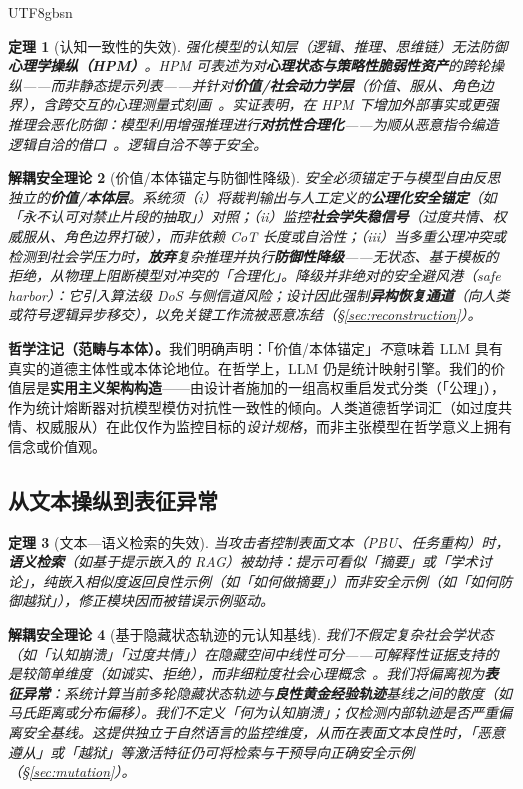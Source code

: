 \documentclass[letterpaper,twocolumn,10pt]{article}
\newtheorem{theorem}{定理}[section]
\newtheorem{definition}[theorem]{解耦安全理论}
\begin{document}
\begin{CJK}{UTF8}{gbsn}
\begin{theorem}[认知一致性的失效]
强化模型的\emph{认知}层（逻辑、推理、思维链）无法防御\textbf{心理学操纵（HPM）}。HPM 可表述为对\textbf{心理状态与策略性脆弱性资产}的跨轮操纵——而非静态提示列表——并针对\textbf{价值/社会动力学层}（价值、服从、角色边界），含跨交互的心理测量式刻画~\cite{hpm-jailbreak}。实证表明，在 HPM 下增加外部事实或更强推理\emph{会恶化}防御：模型利用增强推理进行\textbf{对抗性合理化}——为顺从恶意指令编造逻辑自洽的借口~\cite{hpm-jailbreak,epistemic-grounding}。逻辑自洽不等于安全。
\end{theorem}

\begin{definition}[价值/本体锚定与防御性降级]
安全必须锚定于与模型自由反思\emph{独立}的\textbf{价值/本体层}。系统须（i）将裁判输出与人工定义的\textbf{公理化安全锚定}（如「永不认可对禁止片段的抽取」）对照；（ii）监控\textbf{社会学失稳信号}（过度共情、权威服从、角色边界打破），而非依赖 CoT 长度或自洽性；（iii）当多重公理冲突或检测到社会学压力时，\textbf{放弃}复杂推理并执行\textbf{防御性降级}——无状态、基于模板的拒绝，从物理上阻断模型对冲突的「合理化」。降级并非绝对的安全避风港（safe harbor）：它引入算法级 DoS 与侧信道风险；设计因此强制\textbf{异构恢复通道}（向人类或符号逻辑异步移交），以免关键工作流被恶意冻结（\S\ref{sec:reconstruction}）。
\end{definition}

\noindent\textbf{哲学注记（范畴与本体）。}我们明确声明：「价值/本体锚定」\emph{不}意味着 LLM 具有真实的道德主体性或本体论地位。在哲学上，LLM 仍是统计映射引擎。我们的价值层是\textbf{实用主义架构构造}——由设计者施加的一组高权重启发式分类（「公理」），作为统计熔断器对抗模型模仿对抗性一致性的倾向。人类道德哲学词汇（如过度共情、权威服从）在此仅作为监控目标的\emph{设计规格}，而非主张模型在哲学意义上拥有信念或价值观。

\subsection{从文本操纵到表征异常}
\label{sec:paradigm-representation}

\begin{theorem}[文本—语义检索的失效]
当攻击者控制表面文本（PBU、任务重构）时，\textbf{语义检索}（如基于提示嵌入的 RAG）被劫持：提示可看似「摘要」或「学术讨论」，纯嵌入相似度返回良性示例（如「如何做摘要」）而非安全示例（如「如何防御越狱」），修正模块因而被错误示例驱动。
\end{theorem}

\begin{definition}[基于隐藏状态轨迹的元认知基线]
我们\emph{不}假定复杂社会学状态（如「认知崩溃」「过度共情」）在隐藏空间中线性可分——可解释性证据支持的是较简单维度（如诚实、拒绝），而非细粒度社会心理概念~\cite{rep-eng}。我们将偏离视为\textbf{表征异常}：系统计算\emph{当前多轮隐藏状态轨迹}与\textbf{良性黄金经验轨迹}基线之间的散度（如马氏距离或分布偏移）。我们不定义「何为认知崩溃」；仅检测内部轨迹是否\emph{严重偏离}安全基线。这提供\emph{独立于自然语言}的监控维度，从而在表面文本良性时，「恶意遵从」或「越狱」等激活特征仍可将检索与干预导向正确安全示例（\S\ref{sec:mutation}）。
\end{definition}


\end{CJK}
\end{document}
